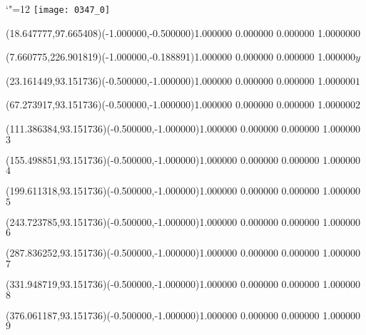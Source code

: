 \documentclass[12pt]{article}
\begin{document}
\makeatletter%
\let\ASYencoding\f@encoding%
\let\ASYfamily\f@family%
\let\ASYseries\f@series%
\let\ASYshape\f@shape%
\makeatother%
{\catcode`"=12%
\texttt{[image: 0347\_0]}%
}%
\kern -427.549719pt%
%
%
\fontsize{12.000000}{14.400000}\selectfont%
\usefont{\ASYencoding}{\ASYfamily}{\ASYseries}{\ASYshape}%
\ASYalignT(18.647777,97.665408)(-1.000000,-0.500000){1.000000 0.000000 0.000000 1.000000}{\vphantom{$10^4$}$0$}%
%
%
\fontsize{12.000000}{14.400000}\selectfont%
\ASYalignT(7.660775,226.901819)(-1.000000,-0.188891){1.000000 0.000000 0.000000 1.000000}{$y$}%
%
%
\fontsize{12.000000}{14.400000}\selectfont%
\ASYalignT(23.161449,93.151736)(-0.500000,-1.000000){1.000000 0.000000 0.000000 1.000000}{\vphantom{$10^4$}$1$}%
%
%
\fontsize{12.000000}{14.400000}\selectfont%
\ASYalignT(67.273917,93.151736)(-0.500000,-1.000000){1.000000 0.000000 0.000000 1.000000}{\vphantom{$10^4$}$2$}%
%
%
\fontsize{12.000000}{14.400000}\selectfont%
\ASYalignT(111.386384,93.151736)(-0.500000,-1.000000){1.000000 0.000000 0.000000 1.000000}{\vphantom{$10^4$}$3$}%
%
%
\fontsize{12.000000}{14.400000}\selectfont%
\ASYalignT(155.498851,93.151736)(-0.500000,-1.000000){1.000000 0.000000 0.000000 1.000000}{\vphantom{$10^4$}$4$}%
%
%
\fontsize{12.000000}{14.400000}\selectfont%
\ASYalignT(199.611318,93.151736)(-0.500000,-1.000000){1.000000 0.000000 0.000000 1.000000}{\vphantom{$10^4$}$5$}%
%
%
\fontsize{12.000000}{14.400000}\selectfont%
\ASYalignT(243.723785,93.151736)(-0.500000,-1.000000){1.000000 0.000000 0.000000 1.000000}{\vphantom{$10^4$}$6$}%
%
%
\fontsize{12.000000}{14.400000}\selectfont%
\ASYalignT(287.836252,93.151736)(-0.500000,-1.000000){1.000000 0.000000 0.000000 1.000000}{\vphantom{$10^4$}$7$}%
%
%
\fontsize{12.000000}{14.400000}\selectfont%
\ASYalignT(331.948719,93.151736)(-0.500000,-1.000000){1.000000 0.000000 0.000000 1.000000}{\vphantom{$10^4$}$8$}%
%
%
\fontsize{12.000000}{14.400000}\selectfont%
\ASYalignT(376.061187,93.151736)(-0.500000,-1.000000){1.000000 0.000000 0.000000 1.000000}{\vphantom{$10^4$}$9$}%
%
%
\fontsize{12.000000}{14.400000}\selectfont%
\end{document}
